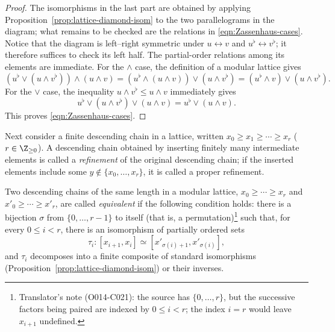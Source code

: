 \begin{proof}
	The isomorphisms in the last part are obtained by applying
	Proposition~\ref{prop:lattice-diamond-isom} to the two parallelograms in the
	diagram; what remains to be checked are the relations in
	\eqref{eqn:Zassenhaus-cases}. Notice that the diagram is left--right
	symmetric under $u\leftrightarrow v$ and
	$u^\flat\leftrightarrow v^\flat$; it therefore suffices to check its left
	half. The partial-order relations among its elements are immediate. For the
	$\wedge$ case, the definition of a modular lattice gives
	\begin{equation*}
		\left( u^\flat \vee (u \wedge v^\flat)\right) \wedge (u \wedge v) = \left( u^\flat \wedge (u \wedge v) \right) \vee (u \wedge v^\flat) = (u^\flat \wedge v) \vee (u \wedge v^\flat).
	\end{equation*}
	For the $\vee$ case, the inequality $u\wedge v^\flat\leq u\wedge v$
	immediately gives
	\begin{equation*}
		u^\flat \vee (u \wedge v^\flat) \vee (u \wedge v) = u^\flat \vee (u \wedge v).
	\end{equation*}
	This proves \eqref{eqn:Zassenhaus-cases}.
\end{proof}

Next consider a finite descending chain in a lattice, written
$x_0\geq x_1\geq\cdots\geq x_r$ ($r\in\Z_{\geq0}$). A descending chain
obtained by inserting finitely many intermediate elements is called a
\emph{refinement} of the original descending chain; if the inserted elements
include some $y\notin\{x_0,\ldots,x_r\}$, it is called a proper refinement.

\begin{definition}\label{def:Schreier-equiv}
	Two descending chains of the same length in a modular lattice,
	$x_0\geq\cdots\geq x_r$ and $x'_0\geq\cdots\geq x'_r$, are called
	\emph{equivalent} if the following condition holds: there is a bijection
	$\sigma$ from $\{0,\ldots,r-1\}$ to itself (that is, a
	permutation)\footnote{Translator's note (O014-C021): the source has
	$\{0,\ldots,r\}$, but the successive factors being paired are indexed by
	$0\leq i<r$; the index $i=r$ would leave $x_{i+1}$ undefined.} such that,
	for every $0\leq i<r$, there is an isomorphism of partially ordered sets
	\[ \tau_i: \left[ x_{i+1}, x_i \right] \simeq \left[ x'_{\sigma(i) + 1}, x'_{\sigma(i)} \right], \]
	and $\tau_i$ decomposes into a finite composite of standard isomorphisms
	(Proposition~\ref{prop:lattice-diamond-isom}) or their inverses.
\end{definition}

